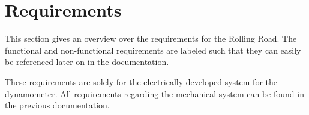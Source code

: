 \chapter{Requirements}
This section gives an overview over the requirements for the Rolling Road. The functional and non-functional requirements are labeled such that they can easily be referenced later on in the documentation.

These requirements are solely for the electrically developed system for the dynamometer. All requirements regarding the mechanical system can be found in the previous documentation\cite{BAC_rullefelt}.


